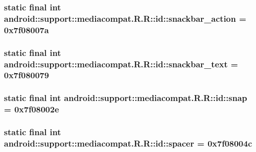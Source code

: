 \hypertarget{classandroid_1_1support_1_1mediacompat_1_1_r_1_1id_190d4a0812a8a33ea8ca28d709dd61a8}{
\subsubsection[{snackbar\_\-action}]{\setlength{\rightskip}{0pt plus 5cm}static final int android::support::mediacompat.R.R::id::snackbar\_\-action = 0x7f08007a}}
\label{classandroid_1_1support_1_1mediacompat_1_1_r_1_1id_190d4a0812a8a33ea8ca28d709dd61a8}


\hypertarget{classandroid_1_1support_1_1mediacompat_1_1_r_1_1id_9259c50601b96a8a5322a69372f91acd}{
\subsubsection[{snackbar\_\-text}]{\setlength{\rightskip}{0pt plus 5cm}static final int android::support::mediacompat.R.R::id::snackbar\_\-text = 0x7f080079}}
\label{classandroid_1_1support_1_1mediacompat_1_1_r_1_1id_9259c50601b96a8a5322a69372f91acd}


\hypertarget{classandroid_1_1support_1_1mediacompat_1_1_r_1_1id_c8f285be8eb7874ac039ac9e59cfc53f}{
\subsubsection[{snap}]{\setlength{\rightskip}{0pt plus 5cm}static final int android::support::mediacompat.R.R::id::snap = 0x7f08002e}}
\label{classandroid_1_1support_1_1mediacompat_1_1_r_1_1id_c8f285be8eb7874ac039ac9e59cfc53f}


\hypertarget{classandroid_1_1support_1_1mediacompat_1_1_r_1_1id_13c1d30928caaa393873833706a5ead3}{
\subsubsection[{spacer}]{\setlength{\rightskip}{0pt plus 5cm}static final int android::support::mediacompat.R.R::id::spacer = 0x7f08004c}}
\label{classandroid_1_1support_1_1mediacompat_1_1_r_1_1id_13c1d30928caaa393873833706a5ead3}


